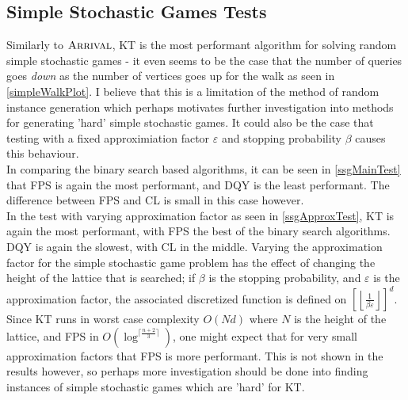 \subsection{Simple Stochastic Games Tests}
Similarly to $\textsc{Arrival}$, KT is the most performant algorithm for solving
random simple stochastic games - it even seems to be the case
that the number of queries goes \emph{down} as the number of vertices
goes up for the walk as seen in \cref{simpleWalkPlot}. 
I believe that this is a limitation of the method
of random instance generation which perhaps motivates further investigation
into methods for generating 'hard' simple stochastic games. It could also
be the case that testing with a fixed approximiation factor $\varepsilon$
and stopping probability $\beta$ causes this behaviour. \\
In comparing the binary search based algorithms, it can be seen in \cref{ssgMainTest} 
that
FPS is again the most performant, and DQY is the least performant. The difference
between FPS and CL is small in this case however. \\
In the test with varying approximation factor as seen in \cref{ssgApproxTest}, KT 
is again the most performant, with FPS the best of the binary search algorithms.
DQY is again the slowest, with CL in the middle. Varying the approximation factor
for the simple stochastic game problem has the effect of changing the height of the lattice
that is searched; if $\beta$ is the stopping probability, and $\varepsilon$ is the approximation
factor, the associated discretized function is 
defined on $\left[\left \lfloor \frac{1}{\beta \varepsilon}\right \rfloor\right]^d$.
Since KT runs in worst case complexity $O(Nd)$ where $N$ is the height of the lattice,
and FPS in $O(\log^{\lceil \frac{n + 2}{3} \rceil})$, one might expect that for
very small approximation factors that FPS is more performant. This is not shown in
the results however, so perhaps more investigation should be done into finding
instances of simple stochastic games which are 'hard' for KT.

